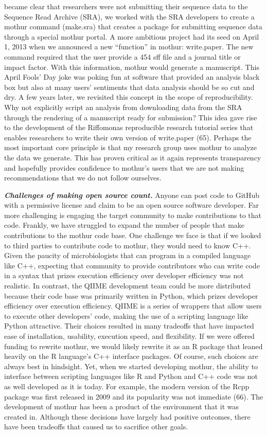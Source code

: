 \documentclass[11pt,]{article}
\begin{document}
became clear that researchers were not submitting their sequence data to
the Sequence Read Archive (SRA), we worked with the SRA developers to
create a mothur command (make.sra) that creates a package for submitting
sequence data through a special mothur portal. A more ambitious project
had its seed on April 1, 2013 when we announced a new ``function'' in
mothur: write.paper. The new command required that the user provide a
454 sff file and a journal title or impact factor. With this
information, mothur would generate a manuscript. This April Fools' Day
joke was poking fun at software that provided an analysis black box but
also at many users' sentiments that data analysis should be so cut and
dry. A few years later, we revisited this concept in the scope of
reproducibility. Why not explicitly script an analysis from downloading
data from the SRA through the rendering of a manuscript ready for
submission? This idea gave rise to the development of the Riffomonas
reproducible research tutorial series that enables researchers to write
their own version of write.paper (65). Perhaps the most important core
principle is that my research group uses mothur to analyze the data we
generate. This has proven critical as it again represents transparency
and hopefully provides confidence to mothur's users that we are not
making recommendations that we do not follow ourselves.

\textbf{\emph{Challenges of making open source count.}} Anyone can post
code to GitHub with a permissive license and claim to be an open source
software developer. Far more challenging is engaging the target
community to make contributions to that code. Frankly, we have struggled
to expand the number of people that make contributions to the mothur
code base. One challenge we face is that if we looked to third parties
to contribute code to mothur, they would need to know C++. Given the
paucity of microbiologists that can program in a compiled language like
C++, expecting that community to provide contributors who can write code
in a syntax that prizes execution efficiency over developer efficiency
was not realistic. In contrast, the QIIME development team could be more
distributed because their code base was primarily written in Python,
which prizes developer efficiency over execution efficiency. QIIME is a
series of wrappers that allow users to execute other developers' code,
making the use of a scripting language like Python attractive. Their
choices resulted in many tradeoffs that have impacted ease of
installation, usability, execution speed, and flexibility. If we were
offered funding to rewrite mothur, we would likely rewrite it as an R
package that leaned heavily on the R language's C++ interface packages.
Of course, such choices are always best in hindsight. Yet, when we
started developing mothur, the ability to interface between scripting
languages like R and Python and C++ code was not as well developed as it
is today. For example, the modern version of the Rcpp package was first
released in 2009 and its popularity was not immediate (66). The
development of mothur has been a product of the environment that it was
created in. Although these decisions have largely had positive outcomes,
there have been tradeoffs that caused us to sacrifice other goals.
\end{document}
